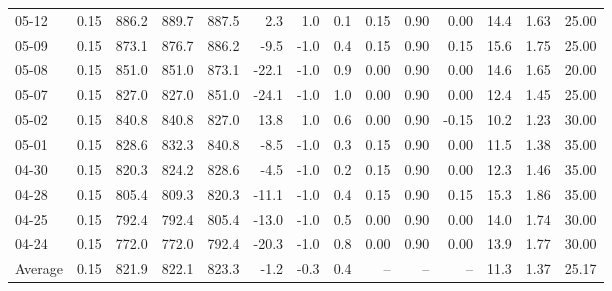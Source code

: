 \begin{threeparttable}
{\begin{tabular}{lrrrrrrrrrrrrr}
  05-12 &     0.15 & 886.2 & 889.7 & 887.5 &        2.3 &                      1.0 &                 0.1 &       0.15 &      0.90 &           0.00 &             14.4 &            1.63 &                  25.00 \\
  05-09 &     0.15 & 873.1 & 876.7 & 886.2 &       -9.5 &                     -1.0 &                 0.4 &       0.15 &      0.90 &           0.15 &             15.6 &            1.75 &                  25.00 \\
  05-08 &     0.15 & 851.0 & 851.0 & 873.1 &      -22.1 &                     -1.0 &                 0.9 &       0.00 &      0.90 &           0.00 &             14.6 &            1.65 &                  20.00 \\
  05-07 &     0.15 & 827.0 & 827.0 & 851.0 &      -24.1 &                     -1.0 &                 1.0 &       0.00 &      0.90 &           0.00 &             12.4 &            1.45 &                  25.00 \\
  05-02 &     0.15 & 840.8 & 840.8 & 827.0 &       13.8 &                      1.0 &                 0.6 &       0.00 &      0.90 &          -0.15 &             10.2 &            1.23 &                  30.00 \\
  05-01 &     0.15 & 828.6 & 832.3 & 840.8 &       -8.5 &                     -1.0 &                 0.3 &       0.15 &      0.90 &           0.00 &             11.5 &            1.38 &                  35.00 \\
  04-30 &     0.15 & 820.3 & 824.2 & 828.6 &       -4.5 &                     -1.0 &                 0.2 &       0.15 &      0.90 &           0.00 &             12.3 &            1.46 &                  35.00 \\
  04-28 &     0.15 & 805.4 & 809.3 & 820.3 &      -11.1 &                     -1.0 &                 0.4 &       0.15 &      0.90 &           0.15 &             15.3 &            1.86 &                  35.00 \\
  04-25 &     0.15 & 792.4 & 792.4 & 805.4 &      -13.0 &                     -1.0 &                 0.5 &       0.00 &      0.90 &           0.00 &             14.0 &            1.74 &                  30.00 \\
  04-24 &     0.15 & 772.0 & 772.0 & 792.4 &      -20.3 &                     -1.0 &                 0.8 &       0.00 &      0.90 &           0.00 &             13.9 &            1.77 &                  30.00 \\
Average &     0.15 & 821.9 & 822.1 & 823.3 &       -1.2 &                     -0.3 &                 0.4 &         -- &        -- &             -- &             11.3 &            1.37 &                  25.17 \\

\end{tabular}}
\end{threeparttable}
